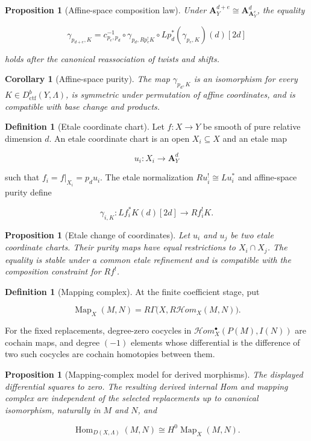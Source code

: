 \documentclass[10pt]{article}
\newtheorem{proposition}[theorem]{Proposition}
\newtheorem{corollary}[theorem]{Corollary}
\theoremstyle{definition}
\newtheorem{definition}[theorem]{Definition}
\newcommand{\Dctf}{D^b_{\mathrm{ctf}}}
\begin{document}
\begin{proposition}[Affine-space composition law]
Under
\(\mathbf A^{d+e}_Y\cong\mathbf A^d_{\mathbf A^e_Y}\), the equality

\[
 \gamma_{p_{d+e},K}
 =c_{p_e,p_d}^{-1}\circ
 \gamma_{p_d,Rp_e^!K}\circ
 Lp_d^*(\gamma_{p_e,K})(d)[2d]
\]

holds after the canonical reassociation of twists and shifts.
\end{proposition}

\begin{corollary}[Affine-space purity]
The map \(\gamma_{p_d,K}\) is an isomorphism for every
\(K\in\Dctf(Y,\Lambda)\), is symmetric under permutation of affine
coordinates, and is compatible with base change and products.
\end{corollary}

\begin{definition}[Etale coordinate chart]
Let \(f:X\to Y\) be smooth of pure relative dimension \(d\).  An etale
coordinate chart is an open \(X_i\subseteq X\) and an etale map

\[
 u_i:X_i\longrightarrow\mathbf A^d_Y
\]

such that \(f_i=f|_{X_i}=p_d u_i\).  The etale normalization
\(Ru_i^!\cong Lu_i^*\) and affine-space purity define

\[
 \gamma_{i,K}:Lf_i^*K(d)[2d]\longrightarrow Rf_i^!K.
\]
\end{definition}

\begin{proposition}[Etale change of coordinates]
Let \(u_i\) and \(u_j\) be two etale coordinate charts.  Their purity maps
have equal restrictions to \(X_i\cap X_j\).  The equality is stable under a
common etale refinement and is compatible with the composition constraint
for \(Rf^!\).
\end{proposition}

\begin{definition}[Mapping complex]
At the finite coefficient stage, put

\[
 \operatorname{Map}_X(M,N)=
 R\Gamma\bigl(X,R\mathcal Hom_X(M,N)\bigr).
\]

For the fixed replacements, degree-zero cocycles in
\(\mathcal Hom_X^\bullet(P(M),I(N))\) are cochain maps, and degree
\((-1)\) elements whose differential is the difference of two such
cocycles are cochain homotopies between them.
\end{definition}

\begin{proposition}[Mapping-complex model for derived morphisms]
The displayed differential squares to zero.  The resulting derived internal
Hom and mapping complex are independent of the selected replacements up to
canonical isomorphism, naturally in \(M\) and \(N\), and

\[
 \operatorname{Hom}_{D(X,\Lambda)}(M,N)
 \cong H^0\operatorname{Map}_X(M,N).
\]
\end{proposition}
\end{document}
